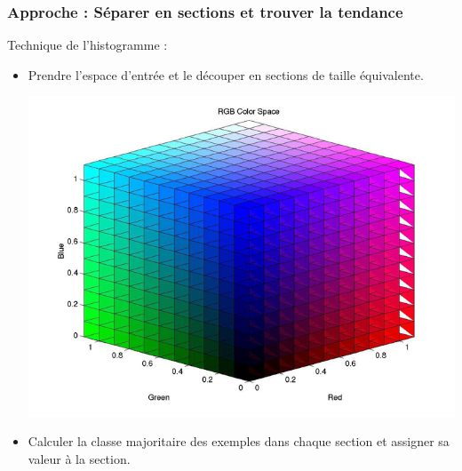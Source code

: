 \documentclass[french]{beamer}
\begin{document}
\begin{frame}[fragile]
\frametitle{Approche : Séparer en sections et trouver la tendance}

Technique de l'histogramme :
\pause
\begin{itemize}
\item Prendre l'espace d'entrée et le découper en sections de taille équivalente. 

\begin{center}
\includegraphics[scale=0.25]{RGB-color-space.jpg}
\end{center}

\pause
		
\item Calculer la classe majoritaire des exemples dans chaque section et assigner sa valeur à la section.


\end{itemize}

\end{frame}
\end{document}
